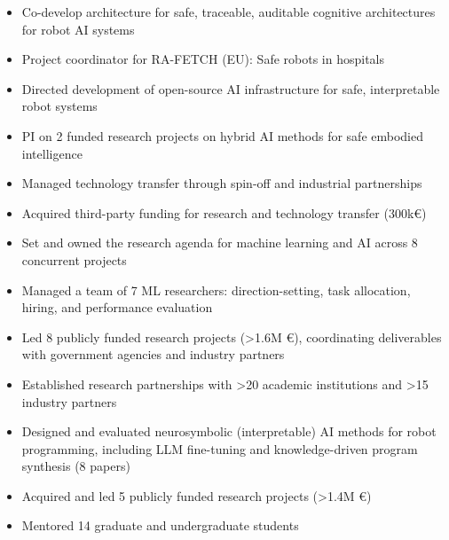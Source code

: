 
\begin{itemize}
  \item Co-develop architecture for safe, traceable, auditable cognitive architectures for robot AI systems
  \item Project coordinator for RA-FETCH (EU): Safe robots in hospitals
\end{itemize}

\medskip

\begin{itemize}
  \item Directed development of open-source AI infrastructure for safe, interpretable robot systems
  \item PI on 2 funded research projects on hybrid AI methods for safe embodied intelligence
  \item Managed technology transfer through spin-off and industrial partnerships
  \item Acquired third-party funding for research and technology transfer (300k€)
\end{itemize}

\medskip

\begin{itemize}
  \item Set and owned the research agenda for machine learning and AI across 8 concurrent projects
  \item Managed a team of 7 ML researchers: direction-setting, task allocation, hiring, and performance evaluation
  \item Led 8 publicly funded research projects (>1.6M €), coordinating deliverables with government agencies and industry partners
  \item Established research partnerships with >20 academic institutions and >15 industry partners
\end{itemize}

\medskip

\begin{itemize}
  \item Designed and evaluated neurosymbolic (interpretable) AI methods for robot programming, including LLM fine-tuning and knowledge-driven program synthesis (8 papers)
  \item Acquired and led 5 publicly funded research projects (>1.4M €)
  \item Mentored 14 graduate and undergraduate students
\end{itemize}

